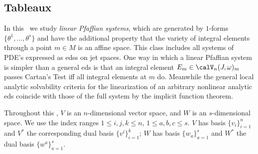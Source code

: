 \subsection{Tableaux}


In this \subsect\ we study \emph{linear Pfaffian systems}, which are generated by $1$-forms $\{\theta^1,\ldots,\theta^s\}$ and have the additional property that the variety of integral elements through a point $m\in M$ is an affine space. This class includes all systems of PDE's expressed as \glspl{eds} on jet spaces. One way in which a linear Pfaffian system is simpler than a general \gls{eds} is that an integral element $E_m\in\calV_n(J,\omega)_m$ passes Cartan's Test iff all integral elements at $m$ do. Meanwhile the general local analytic solvability criteria for the linearization of an arbitrary  nonlinear analytic \gls{eds} coincide with those of the full system by the implicit function theorem.


Throughout this \sect, $V$ is an $n$-dimensional vector space, and $W$ is an $s$-dimensional space. We use the index ranges $1\leq i,j,k\leq n$, $1\leq a,b,c\leq s$. $V$ has basis $\{v_i\}_{i=1}^n$ and $V^\ast$ the corresponding dual basis $\{v^i\}_{i=1}^k$; $W$ has basis $\{w_a\}_{a=1}^s$ and $W^\ast$ the dual basis $\{w^a\}_{a=1}^s$.

